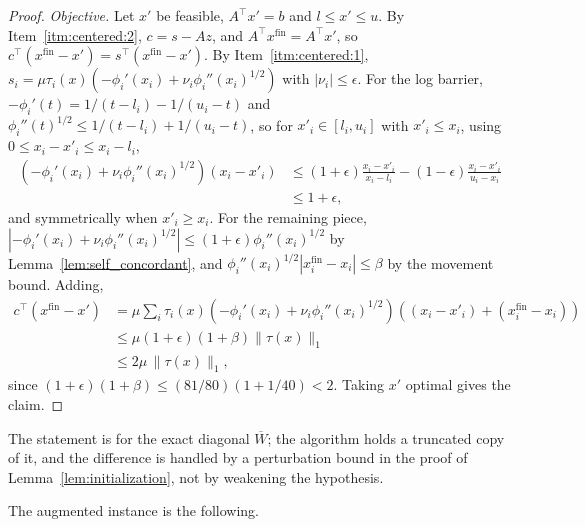 \documentclass[11pt]{article}
\begin{document}
\begin{proof}
\emph{Objective.}
Let $x'$ be feasible,
$A^\top x' = b$ and
$l \le x' \le u$.
By Item~\ref{itm:centered:2}, $c = s - A z$, and
$A^\top x^{\mathrm{fin}} = A^\top x'$, so
$c^\top (x^{\mathrm{fin}} - x') = s^\top (x^{\mathrm{fin}} - x')$.
By Item~\ref{itm:centered:1},
$s_i = \mu \tau_i(x) ( - \phi_i'(x_i) + \nu_i \phi_i''(x_i)^{1/2} )$ with
$|\nu_i| \le \epsilon$.
For the log barrier, $- \phi_i'(t) = 1 / (t - l_i) - 1 / (u_i - t)$ and
$\phi_i''(t)^{1/2} \le 1 / (t - l_i) + 1 / (u_i - t)$, so for
$x'_i \in [l_i, u_i]$ with
$x'_i \le x_i$, using
$0 \le x_i - x'_i \le x_i - l_i$,
\[
\begin{aligned}
\left( - \phi_i'(x_i) + \nu_i \phi_i''(x_i)^{1/2} \right)
\left( x_i - x'_i \right)
&\le
\left( 1 + \epsilon \right) \frac{x_i - x'_i}{x_i - l_i}
-
\left( 1 - \epsilon \right) \frac{x_i - x'_i}{u_i - x_i}
\\
&\le
1 + \epsilon ,
\end{aligned}
\]
and symmetrically when $x'_i \ge x_i$.
For the remaining piece,
$|{-\phi_i'(x_i)} + \nu_i \phi_i''(x_i)^{1/2}| \le (1 + \epsilon) \phi_i''(x_i)^{1/2}$
by Lemma~\ref{lem:self_concordant}, and
$\phi_i''(x_i)^{1/2} |x^{\mathrm{fin}}_i - x_i| \le \beta$ by the movement
bound.
Adding,
\[
\begin{aligned}
c^\top \left( x^{\mathrm{fin}} - x' \right)
&=
\mu \sum_i \tau_i(x)
\left( - \phi_i'(x_i) + \nu_i \phi_i''(x_i)^{1/2} \right)
\left( (x_i - x'_i) + (x^{\mathrm{fin}}_i - x_i) \right)
\\
&\le
\mu \left( 1 + \epsilon \right) \left( 1 + \beta \right) \|\tau(x)\|_1
\\
&\le
2 \mu \, \|\tau(x)\|_1 ,
\end{aligned}
\]
since $(1 + \epsilon)(1 + \beta) \le (81/80)(1 + 1/40) < 2$.
Taking $x'$ optimal gives the claim.
\end{proof}

The statement is for the exact diagonal $\overline{W}$; the algorithm holds a
truncated copy of it, and the difference is handled by a perturbation bound in
the proof of Lemma~\ref{lem:initialization}, not by weakening the hypothesis.

The augmented instance is the following.
\end{document}

